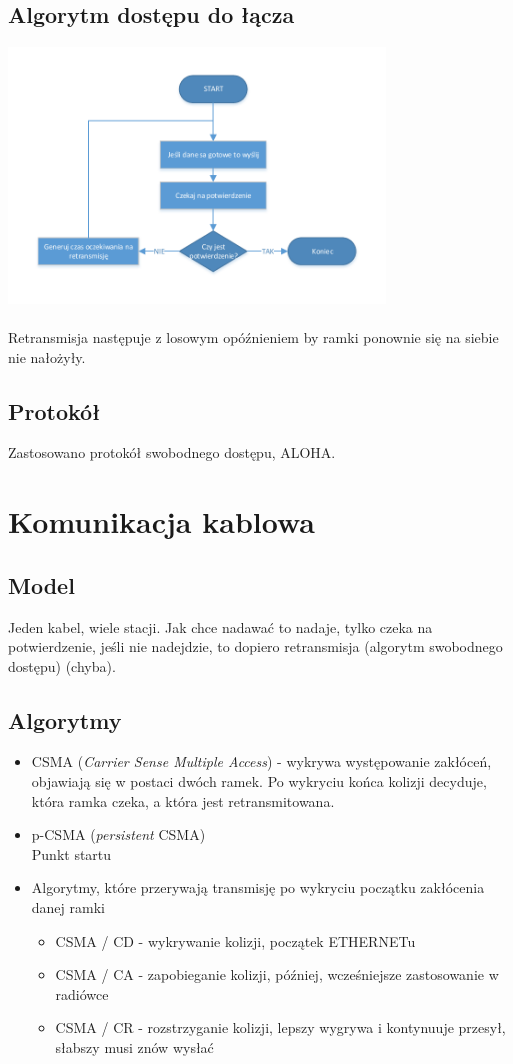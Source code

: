 		\subsection{Algorytm dostępu do łącza}
			\includegraphics[width=10cm]{./images/image19.pdf}\\\\
			Retransmisja następuje z losowym opóźnieniem by ramki ponownie się na siebie nie nałożyły.\\
		\subsection{Protokół}
			Zastosowano protokół swobodnego dostępu, ALOHA.
	\section{Komunikacja kablowa}
		\subsection{Model}
			Jeden kabel, wiele stacji. Jak chce nadawać to nadaje, tylko czeka na potwierdzenie, jeśli nie nadejdzie, to dopiero retransmisja (algorytm swobodnego dostępu) (chyba). 
		\subsection{Algorytmy}
			\begin{itemize}
				\item CSMA (\emph{Carrier Sense Multiple Access}) - wykrywa występowanie zakłóceń, objawiają się w postaci dwóch ramek. Po wykryciu końca kolizji decyduje, która ramka czeka, a która jest retransmitowana.
				\item p-CSMA (\emph{persistent} CSMA)\\
				Punkt startu
				\item Algorytmy, które przerywają transmisję po wykryciu początku zakłócenia danej ramki
				\begin{itemize}
					\item CSMA / CD - wykrywanie kolizji, początek ETHERNETu
					\item CSMA / CA - zapobieganie kolizji, później, wcześniejsze zastosowanie w radiówce
					\item CSMA / CR - rozstrzyganie kolizji, lepszy wygrywa i kontynuuje przesył, słabszy musi znów wysłać
				\end{itemize}
			\end{itemize}
